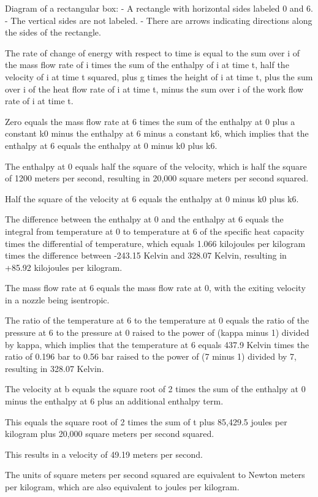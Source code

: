 Diagram of a rectangular box:
- A rectangle with horizontal sides labeled 0 and 6.
- The vertical sides are not labeled.
- There are arrows indicating directions along the sides of the rectangle.

The rate of change of energy with respect to time is equal to the sum over i of the mass flow rate of i times the sum of the enthalpy of i at time t, half the velocity of i at time t squared, plus g times the height of i at time t, plus the sum over i of the heat flow rate of i at time t, minus the sum over i of the work flow rate of i at time t.

Zero equals the mass flow rate at 6 times the sum of the enthalpy at 0 plus a constant k0 minus the enthalpy at 6 minus a constant k6, which implies that the enthalpy at 6 equals the enthalpy at 0 minus k0 plus k6.

The enthalpy at 0 equals half the square of the velocity, which is half the square of 1200 meters per second, resulting in 20,000 square meters per second squared.

Half the square of the velocity at 6 equals the enthalpy at 0 minus k0 plus k6.

The difference between the enthalpy at 0 and the enthalpy at 6 equals the integral from temperature at 0 to temperature at 6 of the specific heat capacity times the differential of temperature, which equals 1.066 kilojoules per kilogram times the difference between -243.15 Kelvin and 328.07 Kelvin, resulting in +85.92 kilojoules per kilogram.

The mass flow rate at 6 equals the mass flow rate at 0, with the exiting velocity in a nozzle being isentropic.

The ratio of the temperature at 6 to the temperature at 0 equals the ratio of the pressure at 6 to the pressure at 0 raised to the power of (kappa minus 1) divided by kappa, which implies that the temperature at 6 equals 437.9 Kelvin times the ratio of 0.196 bar to 0.56 bar raised to the power of (7 minus 1) divided by 7, resulting in 328.07 Kelvin.

The velocity at b equals the square root of 2 times the sum of the enthalpy at 0 minus the enthalpy at 6 plus an additional enthalpy term.

This equals the square root of 2 times the sum of t plus 85,429.5 joules per kilogram plus 20,000 square meters per second squared.

This results in a velocity of 49.19 meters per second.

The units of square meters per second squared are equivalent to Newton meters per kilogram, which are also equivalent to joules per kilogram.